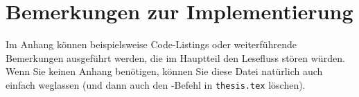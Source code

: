 

\chapter{Bemerkungen zur Implementierung}
\label{Anhang-Implementierung}
		
Im Anhang können beispielsweise Code-Listings oder weiterführende Bemerkungen
ausgeführt werden, die im Hauptteil den Lesefluss stören würden. Wenn Sie keinen
Anhang benötigen, können Sie diese Datei natürlich auch einfach weglassen (und
dann auch den \verb||-Befehl in \texttt{thesis.tex} löschen).

